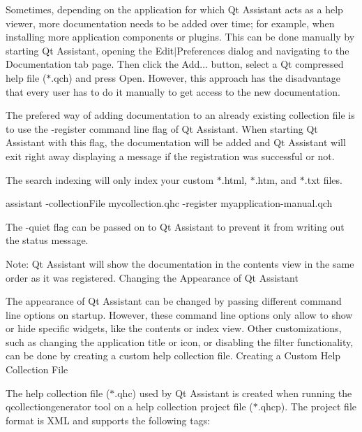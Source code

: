 Sometimes, depending on the application for which Qt Assistant acts as a help viewer, more documentation needs to be added over time; for example, when installing more application components or plugins. This can be done manually by starting Qt Assistant, opening the Edit$|$\-Preferences dialog and navigating to the Documentation tab page. Then click the Add... button, select a Qt compressed help file ($\ast$.qch) and press Open. However, this approach has the disadvantage that every user has to do it manually to get access to the new documentation.

The prefered way of adding documentation to an already existing collection file is to use the -\/register command line flag of Qt Assistant. When starting Qt Assistant with this flag, the documentation will be added and Qt Assistant will exit right away displaying a message if the registration was successful or not.

The search indexing will only index your custom $\ast$.html, $\ast$.htm, and $\ast$.txt files. \begin{DoxyVerb}assistant -collectionFile mycollection.qhc -register myapplication-manual.qch
\end{DoxyVerb}


The -\/quiet flag can be passed on to Qt Assistant to prevent it from writing out the status message.

Note\-: Qt Assistant will show the documentation in the contents view in the same order as it was registered. Changing the Appearance of Qt Assistant

The appearance of Qt Assistant can be changed by passing different command line options on startup. However, these command line options only allow to show or hide specific widgets, like the contents or index view. Other customizations, such as changing the application title or icon, or disabling the filter functionality, can be done by creating a custom help collection file. Creating a Custom Help Collection File

The help collection file ($\ast$.qhc) used by Qt Assistant is created when running the qcollectiongenerator tool on a help collection project file ($\ast$.qhcp). The project file format is X\-M\-L and supports the following tags\-:

